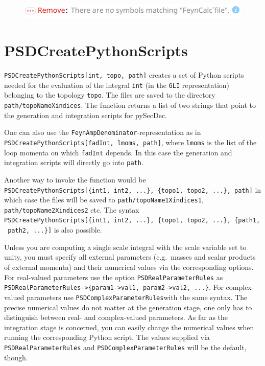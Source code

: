 \documentclass[../FeynHelpersManual.tex]{subfiles}
\begin{document}
\FloatBarrier
\begin{figure}[!ht]
\centering
\includegraphics[width=0.6\linewidth]{img/0uw74idqq2ilw.pdf}
\end{figure}
\FloatBarrier

\hypertarget{psdcreatepythonscripts}{
\section{PSDCreatePythonScripts}\label{psdcreatepythonscripts}}

\texttt{PSDCreatePythonScripts[\allowbreak{}int,\ \allowbreak{}topo,\ \allowbreak{}path]}
creates a set of Python scripts needed for the evaluation of the
integral \texttt{int} (in the \texttt{GLI} representation) belonging to
the topology \texttt{topo}. The files are saved to the directory
\texttt{path/topoNameXindices}. The function returns a list of two
strings that point to the generation and integration scripts for
pySecDec.

One can also use the \texttt{FeynAmpDenominator}-representation as in
\texttt{PSDCreatePythonScripts[\allowbreak{}fadInt,\ \allowbreak{}lmoms,\ \allowbreak{}path]},
where \texttt{lmoms} is the list of the loop momenta on which
\texttt{fadInt} depends. In this case the generation and integration
scripts will directly go into \texttt{path}.

Another way to invoke the function would be
\texttt{PSDCreatePythonScripts[\allowbreak{}\{\allowbreak{}int1,\ \allowbreak{}int2,\ \allowbreak{}...\},\ \allowbreak{}\{\allowbreak{}topo1,\ \allowbreak{}topo2,\ \allowbreak{}...\},\ \allowbreak{}path]}
in which case the files will be saved to
\texttt{path/topoName1Xindices1}, \texttt{path/topoName2Xindices2} etc.
The syntax
\texttt{PSDCreatePythonScripts[\allowbreak{}\{\allowbreak{}int1,\ \allowbreak{}int2,\ \allowbreak{}...\},\ \allowbreak{}\{\allowbreak{}topo1,\ \allowbreak{}topo2,\ \allowbreak{}...\},\ \allowbreak{}\{\allowbreak{}path1,\ \allowbreak{}path2,\ \allowbreak{}...\}]}
is also possible.

Unless you are computing a single scale integral with the scale variable
set to unity, you must specify all external parameters (e.g.~masses and
scalar products of external momenta) and their numerical values via the
corresponding options. For real-valued parameters use the option
\texttt{PSDRealParameterRules} as
\texttt{PSDRealParameterRules->\{\allowbreak{}param1->val1,\ \allowbreak{}param2->val2,\ \allowbreak{}...\}}.
For complex-valued parameters use \texttt{PSDComplexParameterRules}with
the same syntax. The precise numerical values do not matter at the
generation stage, one only has to distinguish between real- and
complex-valued parameters. As far as the integration stage is concerned,
you can easily change the numerical values when running the
corresponding Python script. The values supplied via
\texttt{PSDRealParameterRules} and \texttt{PSDComplexParameterRules}
will be the default, though.
\end{document}
